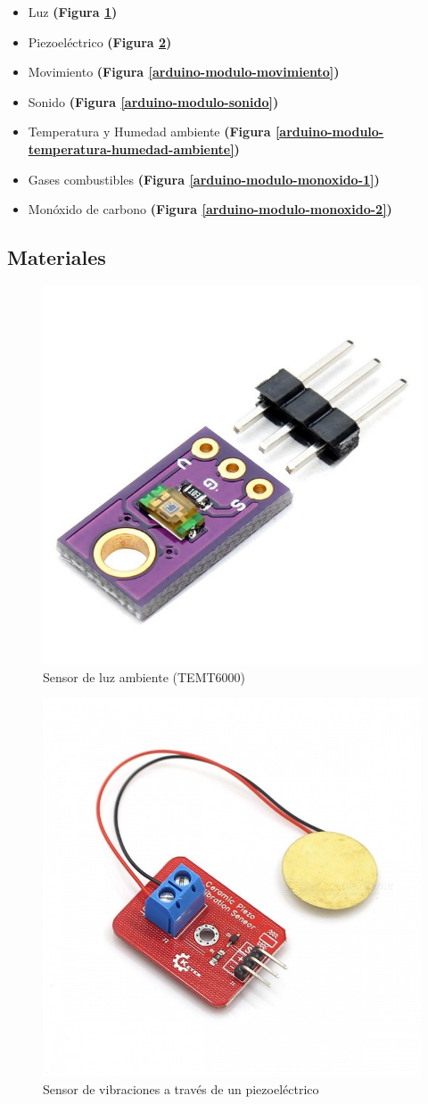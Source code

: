 \documentclass{IEEEtran}
\begin{document}
				\begin{itemize}
					\item Luz \textbf{(Figura \ref{arduino-modulo-luz-ambiente})}
					\item Piezoeléctrico \textbf{(Figura \ref{arduino-modulo-vibracion})}
					\item Movimiento \textbf{(Figura \ref{arduino-modulo-movimiento})}
					\item Sonido \textbf{(Figura \ref{arduino-modulo-sonido})}
					\item Temperatura y Humedad ambiente \textbf{(Figura \ref{arduino-modulo-temperatura-humedad-ambiente})}
					\item Gases combustibles \textbf{(Figura \ref{arduino-modulo-monoxido-1})}
					\item Monóxido de carbono \textbf{(Figura  \ref{arduino-modulo-monoxido-2})}
				\end{itemize}



		\subsection{Materiales}

			\begin{figure}
				\centering
				\includegraphics[width=0.5\linewidth]{arduino-modulo-luz-ambiente}
				\caption{Sensor de luz ambiente (TEMT6000)}
				\label{arduino-modulo-luz-ambiente}
			\end{figure}

			\begin{figure}
				\centering
				\includegraphics[width=0.5\linewidth]{arduino-modulo-vibracion}
				\caption{Sensor de vibraciones a través de un piezoeléctrico}
				\label{arduino-modulo-vibracion}
			\end{figure}
\end{document}

